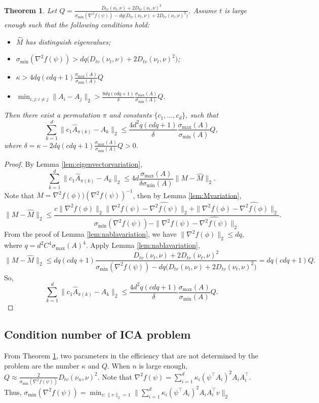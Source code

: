 \documentclass[english]{article} %
\providecommand{\theoremname}{Theorem}
\providecommand{\theoremname}{Theorem}
\theoremstyle{plain}
\newtheorem{thm}{\protect\theoremname}
\theoremstyle{remark}
\theoremstyle{claim}
\theoremstyle{plain}
\begin{document}
 \begin{thm}
 \label{thm:efficiency}
 Let $ Q= \frac{D_{tv}(\nu_t , \nu) + 2 D_{tv}(\nu_t , \nu)^2}{\sigma_{\min}(\nabla^2f(\psi)) - d q\big( D_{tv}(\nu_t , \nu) + 2 D_{tv}(\nu_t , \nu)^2\big)}$. Assume $t$ is large enough such that the following conditions hold:
 \begin{itemize}
 \item $\widehat{M}$ has distinguish eigenvalues;
 \item $\sigma_{\min}(\nabla^2f(\psi)) > d q\big( D_{tv}(\nu_t , \nu) + 2 D_{tv}(\nu_t , \nu)^2\big)$;
 \item $\kappa > 4dq(cdq+1)\frac{\sigma_{\max}(A)}{\sigma_{\min}(A)} Q$
 \item $\min_{i,j:i\neq j} \|A_i - A_j\|_2 > \frac{8dq(cdq+1)}{\delta}\frac{\sigma_{\max}(A)}{\sigma_{\min}(A) } Q$.
 \end{itemize}
 Then there exist a permutation $\pi$ and constants $\{c_1,\ldots,c_d\}$, such that
 \[
 \sum_{k=1}^{d}\| c_1\widehat{A}_{\pi(k)} - A_k\|_2 \le \frac{4d^2q(cdq+1)}{\delta} \frac{\sigma_{\max}(A)}{ \sigma_{\min}(A)}Q ,
 \]
 where $\delta = \kappa -  2 dq(cdq+1)\frac{\sigma_{\max}(A)}{\sigma_{\min}(A)}Q>0$.
 \end{thm}
 \begin{proof}
 By Lemma \ref{lem:eigenvectorvariation}, 
 \[
 \sum_{k=1}^{d}\| c_1\widehat{A}_{\pi(k)} - A_k\|_2 \le 4d  \frac{\sigma_{\max}(A)}{\delta \sigma_{\min}(A) } \|M - \widehat{M} \|_2. 
 \]
 Note that $M = \nabla^2f(\phi))(\nabla^2f(\psi))^{-1}$,  then by Lemma \ref{lem:Mvariation},
 \[
 \|M - \widehat{M} \|_2 \le \frac{c\|\nabla^2f(\phi)\|_2\|\nabla^2f(\psi) - \widehat{\nabla^2f(\psi)}\|_2+\|\nabla^2f(\phi) - \widehat{\nabla^2f(\phi)}\|_2}{\sigma_{\min}(\nabla^2f(\psi)) - \|\nabla^2f(\psi) - \widehat{\nabla^2f(\psi)}\|_2}. 
 \]
 From the proof of Lemma \ref{lem:nablavariation}, we have $\|\nabla^2 f(\phi)\|_2\le dq$, where $q = d^2C^4\sigma_{\max}(A)^4$. Apply Lemma \ref{lem:nablavariation}, 
 \[
 \|M - \widehat{M} \|_2 \le dq(cdq+1) \frac{D_{tv}(\nu_t , \nu) + 2 D_{tv}(\nu_t , \nu)^2}{\sigma_{\min}(\nabla^2f(\psi)) - d q\big( D_{tv}(\nu_t , \nu) + 2 D_{tv}(\nu_t , \nu)^2\big)}  = dq(cdq+1) Q.
 \]
 So, 
 \[
 \sum_{k=1}^{d}\| c_1\widehat{A}_{\pi(k)} - A_k\|_2 \le \frac{4d^2q(cdq+1)}{\delta} \frac{\sigma_{\max}(A)}{ \sigma_{\min}(A)}Q. 
 \]
 \end{proof}

\subsection{Condition number of ICA problem}
From Theorem \ref{thm:efficiency}, two parameters in the efficiency that are not determined by the problem are the number $\kappa$ and $Q$. 
When $n$ is large enough, $Q\approx \frac{2}{\sigma_{\min}(\nabla^2f(\psi))}D_{tv}(\nu_n , \nu)^2$. 
Note that $\nabla^2f(\psi) = \sum_{i=1}^{d} \kappa_i(\psi^{\top}A_i)^2A_iA_i^{\top}$. Thus, $\sigma_{\min}(\nabla^2f(\psi)) = \min_{v:\|v\|_2=1}\|\sum_{i=1}^{d} \kappa_i(\psi^{\top}A_i)^2A_iA_i^{\top}v\|_2$ 
\end{document}
